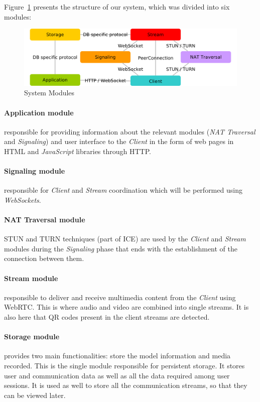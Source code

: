 \documentclass[10pt,conference]{IEEEtran}
\begin{document}
Figure~\ref{fig:modules} presents the structure of our system, which was divided into six modules:


\begin{figure}
	\centering
	\includegraphics[width=\linewidth]{figures/modules2.png}
	\caption{System Modules}
    \label{fig:modules}
\end{figure}

\paragraph{Application module} responsible for providing information about the relevant modules (\emph{NAT Traversal} and \emph{Signaling}) and user interface to the \emph{Client} in the form of web pages in \gls{HTML} and \emph{JavaScript} libraries through \gls{HTTP}.
 
\paragraph{Signaling module} responsible for \emph{Client} and \emph{Stream} coordination which will be performed using \emph{WebSockets}.

\paragraph{NAT Traversal module} \gls{STUN} and \gls{TURN} techniques (part of \gls{ICE}) are used by the \emph{Client} and \emph{Stream} modules during the \emph{Signaling} phase that ends with the establishment of the connection between them.

\paragraph{Stream module} responsible to deliver and receive multimedia content from the \emph{Client} using \gls{WebRTC}. This is where audio and video are combined into single streams. It is also here that \gls{QR} codes present in the client streams are detected.

\paragraph{Storage module} provides two main functionalities: store the model information and media recorded. This is the single module responsible for persistent storage. It stores user and communication data as well as all the data required among user sessions. It is used as well to store all the communication streams, so that they can be viewed later.
\end{document}
